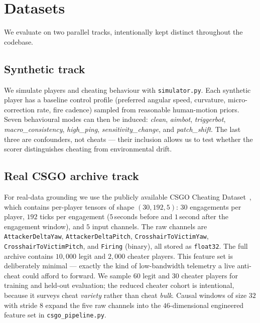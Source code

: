 \documentclass[conference,10pt]{IEEEtran}
\begin{document}
\section{Datasets}
\label{sec:data}

We evaluate on two parallel tracks, intentionally kept distinct
throughout the codebase.

\subsection{Synthetic track}

We simulate players and cheating behaviour with
\texttt{simulator.py}. Each synthetic player has a baseline control
profile (preferred angular speed, curvature, micro-correction rate,
fire cadence) sampled from reasonable human-motion priors. Seven
behavioural modes can then be induced:
\emph{clean}, \emph{aimbot}, \emph{triggerbot}, \emph{macro\_consistency},
\emph{high\_ping}, \emph{sensitivity\_change}, and \emph{patch\_shift}.
The last three are confounders, not cheats --- their inclusion allows us
to test whether the scorer distinguishes cheating from environmental
drift.

\subsection{Real CSGO archive track}

For real-data grounding we use the publicly available CSGO Cheating
Dataset~\cite{kaggle_csgoarchive}, which contains per-player tensors of
shape $(30, 192, 5)$: $30$ engagements per player, $192$ ticks per
engagement ($5$\,seconds before and $1$\,second after the engagement
window), and $5$ input channels. The raw channels are
\texttt{AttackerDeltaYaw}, \texttt{AttackerDeltaPitch},
\texttt{CrosshairToVictimYaw}, \texttt{CrosshairToVictimPitch}, and
\texttt{Firing} (binary), all stored as \texttt{float32}. The full
archive contains $10{,}000$ legit and $2{,}000$ cheater players. This
feature set is deliberately minimal --- exactly the kind of
low-bandwidth telemetry a live anti-cheat could afford to forward. We
sample $60$ legit and $30$ cheater players for training and held-out
evaluation; the reduced cheater cohort is intentional, because it
surveys cheat \emph{variety} rather than cheat \emph{bulk}. Causal
windows of size $32$ with stride $8$ expand the five raw channels into
the $46$-dimensional engineered feature set in
\texttt{csgo\_pipeline.py}.
\end{document}
